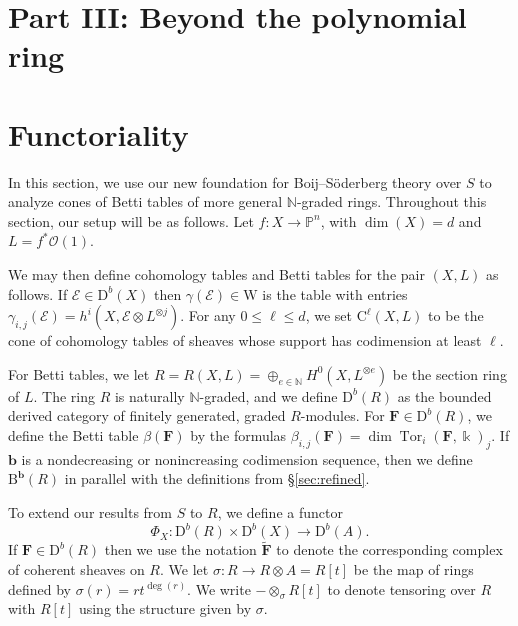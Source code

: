 \documentclass[12pt]{amsart}
\theoremstyle{definition}
\theoremstyle{remark}
\newcommand{\Tor}{\operatorname{Tor}}
\newcommand{\kk}{\Bbbk}
\newcommand{\PP}{\mathbb{P}}
\newcommand{\WW}{\mathrm{W}}
\newcommand{\NN}{\mathbb{N}}
\newcommand{\bb}{\mathbf{b}}
\newcommand{\cO}{\mathcal{O}}
\newcommand{\cE}{\mathcal{E}}
\newcommand{\FF}{\mathbf{F}}
\newcommand{\DD}{\mathrm{D}}
\newcommand{\CQ}{\mathrm{C}}
\newcommand{\BBQ}{\mathrm{B}}
\begin{document}
\section*{Part III: Beyond the polynomial ring}
\section{Functoriality}\label{sec:functor}
In this section, we use our new foundation for Boij--S\"oderberg theory over $S$ to analyze cones of Betti tables of more general $\NN$-graded rings.  Throughout this section, our setup will be as follows.  Let $f: X\to \PP^n$, with $\dim(X)=d$ and $L=f^*\cO(1)$.  

We may then define cohomology tables and Betti tables for the pair $(X,L)$ as follows. If $\cE\in \DD^b(X)$ then $\gamma(\cE)\in \WW$ is the table with entries $\gamma_{i,j}(\cE)=h^i(X,\cE\otimes L^{\otimes j})$.  For any $0\leq \ell \leq d$, we set $\CQ^{\ell}(X,L)$ to be the cone of cohomology tables of sheaves whose support has codimension at least $\ell$.

For Betti tables, we let $R=R(X,L)=\oplus_{e\in \mathbb N} H^0(X,L^{\otimes e})$ be the section ring of $L$.  The ring $R$ is naturally $\NN$-graded, and we define $\DD^b(R)$ as the bounded derived category of finitely generated, graded $R$-modules.  For $\FF\in \DD^b(R)$, we define the Betti table $\beta(\FF)$ by the formulas $\beta_{i,j}(\FF)=\dim \Tor_i(\FF,\kk)_j$.  If $\bb$ is a nondecreasing or nonincreasing codimension sequence, then we define $\BBQ^{\bb}(R)$ in parallel with the definitions from \S\ref{sec:refined}.

To extend our results from $S$ to $R$, we define a functor
\[
\Phi_X: \DD^b(R)\times \DD^b(X)\to \DD^b(A).
\]
If $\FF \in \DD^b(R)$ then we use the notation $\widetilde{\FF}$ to denote the corresponding complex of coherent sheaves on $R$.
We let $\sigma: R\to R\otimes A=R[t]$ be the map of rings defined by $\sigma(r)=rt^{\deg(r)}$.  
We write $-\otimes_\sigma R[t]$ to denote tensoring over $R$ with $R[t]$ using the structure
given by $\sigma$. 
\end{document}
